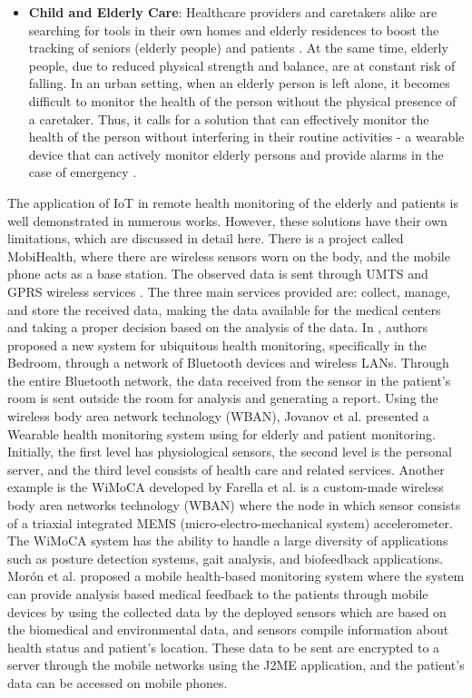 \begin{itemize}
\item \textbf{Child and Elderly Care}:
Healthcare providers and caretakers alike are searching for tools in their own homes and elderly residences to boost the tracking of seniors (elderly people) and patients \cite{38}. At the same time, elderly people, due to reduced physical strength and balance, are at constant risk of falling. In an urban setting, when an elderly person is left alone, it becomes difficult to monitor the health of the person without the physical presence of a caretaker. Thus, it calls for a solution that can effectively monitor the health of the person without interfering in their routine activities - a wearable device that can actively monitor elderly persons and provide alarms in the case of emergency \cite{40}.

\end{itemize}

The application of IoT in remote health monitoring of the elderly and patients is well demonstrated in numerous works. However, these solutions have their own limitations, which are discussed in detail here. There is a project called MobiHealth, where there are wireless sensors worn on the body, and the mobile phone acts as a base station. The observed data is sent through UMTS and GPRS wireless services \cite{14}. The three main services provided are: collect, manage, and store the received data, making the data available for the medical centers and taking a proper decision based on the analysis of the data. In \cite{25}, authors proposed a new system for ubiquitous health monitoring, specifically in the  Bedroom, through a network of Bluetooth devices and wireless LANs.  Through the entire Bluetooth network, the data received from the sensor in the patient's room is sent outside the room for analysis and generating a report. Using the wireless body area network technology (WBAN), Jovanov et al. \cite{43} presented a Wearable health monitoring system using for elderly and patient monitoring.  Initially, the first level has physiological sensors,  the second level is the personal server, and the third level consists of health care and related services. Another example is the  WiMoCA developed by Farella et al. \cite{32} is a custom-made wireless body area networks technology (WBAN) where the node in which sensor consists of a triaxial integrated MEMS (micro-electro-mechanical system) accelerometer.  The  WiMoCA system has the ability to handle a large diversity of applications such as posture detection systems, gait analysis, and biofeedback applications. Morón et al. \cite{33} proposed a mobile health-based monitoring system where the system can provide analysis based medical feedback to the patients through mobile devices by using the collected data by the deployed sensors which are based on the biomedical and environmental data, and sensors compile information about health status and patient’s location. These data to be sent are encrypted to a server through the mobile networks using the J2ME application, and the patient's data can be accessed on mobile phones.

